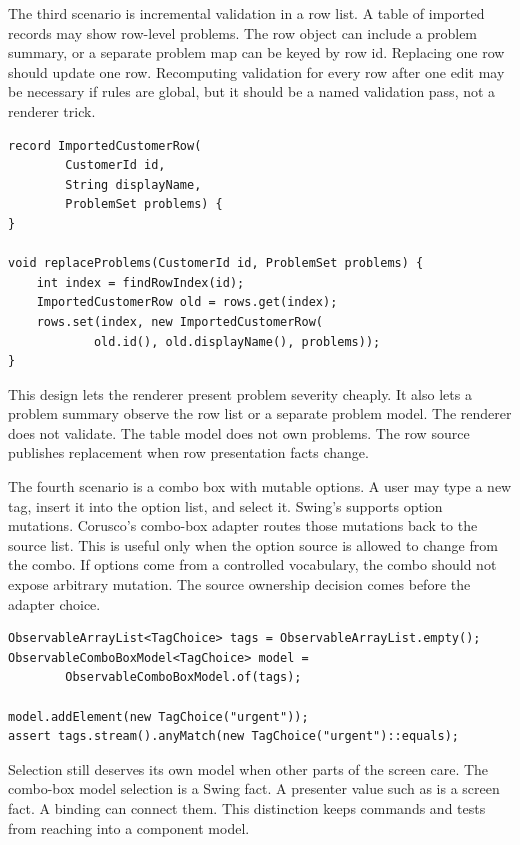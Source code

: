 The third scenario is incremental validation in a row list. A table of imported
records may show row-level problems. The row object can include a problem
summary, or a separate problem map can be keyed by row id. Replacing one row
should update one row. Recomputing validation for every row after one edit may
be necessary if rules are global, but it should be a named validation pass, not
a renderer trick.

\begin{lstlisting}[caption={Row problems can be data, not renderer state.}]
record ImportedCustomerRow(
        CustomerId id,
        String displayName,
        ProblemSet problems) {
}

void replaceProblems(CustomerId id, ProblemSet problems) {
    int index = findRowIndex(id);
    ImportedCustomerRow old = rows.get(index);
    rows.set(index, new ImportedCustomerRow(
            old.id(), old.displayName(), problems));
}
\end{lstlisting}

This design lets the renderer present problem severity cheaply. It also lets a
problem summary observe the row list or a separate problem model. The renderer
does not validate. The table model does not own problems. The row source
publishes replacement when row presentation facts change.

The fourth scenario is a combo box with mutable options. A user may type a new
tag, insert it into the option list, and select it. Swing's
 supports option mutations. Corusco's combo-box
adapter routes those mutations back to the source list. This is useful only when
the option source is allowed to change from the combo. If options come from a
controlled vocabulary, the combo should not expose arbitrary mutation. The source
ownership decision comes before the adapter choice.

\begin{lstlisting}[caption={Combo mutations are source-list mutations.}]
ObservableArrayList<TagChoice> tags = ObservableArrayList.empty();
ObservableComboBoxModel<TagChoice> model =
        ObservableComboBoxModel.of(tags);

model.addElement(new TagChoice("urgent"));
assert tags.stream().anyMatch(new TagChoice("urgent")::equals);
\end{lstlisting}

Selection still deserves its own model when other parts of the screen care. The
combo-box model selection is a Swing fact. A presenter value such as
 is a screen fact. A binding can connect them. This distinction
keeps commands and tests from reaching into a component model.

